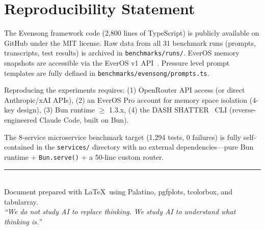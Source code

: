 \documentclass[11pt, a4paper]{article}
\begin{document}
\section{Reproducibility Statement}

The Evensong framework code (2{,}800 lines of TypeScript) is publicly available on GitHub under the MIT license. Raw data from all 31 benchmark runs (prompts, transcripts, test results) is archived in \texttt{benchmarks/runs/}. EverOS memory snapshots are accessible via the EverOS v1 API~\cite{evermind2026everos}. Pressure level prompt templates are fully defined in \texttt{benchmarks/evensong/prompts.ts}.

Reproducing the experiments requires: (1) OpenRouter API access (or direct Anthropic/xAI APIs), (2) an EverOS Pro account for memory space isolation (4-key design), (3) Bun runtime $\geq$ 1.3.x, (4) the DASH SHATTER~\cite{zhu2026dashshatter} CLI (reverse-engineered Claude Code, built on Bun).

The 8-service microservice benchmark target (1{,}294 tests, 0 failures) is fully self-contained in the \texttt{services/} directory with no external dependencies---pure Bun runtime + \texttt{Bun.serve()} + a 50-line custom router.




\vfill

\begin{center}
{\color{accent}\rule{0.5\textwidth}{0.5pt}}\\[8pt]
{\small\sffamily\color{faded} Document prepared with \LaTeX\ using Palatino, pgfplots, tcolorbox, and tabularray.\\[4pt]
\textit{``We do not study AI to replace thinking. We study AI to understand what thinking is.''}}
\end{center}
\end{document}
